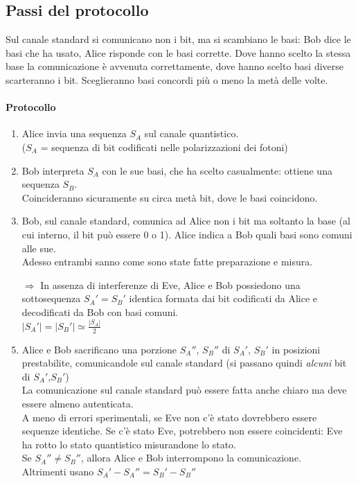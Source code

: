 \documentclass[10pt]{book}
\begin{document}
\subsection{Passi del protocollo}
Sul canale standard si comunicano non i bit, ma si scambiano le basi: Bob dice le basi che ha usato, Alice risponde con le basi corrette. Dove hanno scelto la stessa base la comunicazione è avvenuta correttamente, dove hanno scelto basi diverse scarteranno i bit. Sceglieranno basi concordi più o meno la metà delle volte.
\paragraph{Protocollo} \begin{enumerate}
	\item Alice invia una sequenza $S_A$ sul canale quantistico.\\($S_A$ = sequenza di bit codificati nelle polarizzazioni dei fotoni)
	\item Bob interpreta $S_A$ con le sue basi, che ha scelto casualmente: ottiene una sequenza $S_B$.\\
	Coincideranno sicuramente su circa metà bit, dove le basi coincidono.
	\item Bob, sul canale standard, comunica ad Alice non i bit ma soltanto la base (al cui interno, il bit può essere 0 o 1). Alice indica a Bob quali basi sono comuni alle sue.\\
	Adesso entrambi sanno come sono state fatte preparazione e misura.
	\item[$\Rightarrow$] In assenza di interferenze di Eve, Alice e Bob possiedono una sottosequenza $S_A' = S_B'$ identica formata dai bit codificati da Alice e decodificati da Bob con basi comuni.\\
	$|S_A'|=|S_B'| \simeq \frac{|S_A|}{2}$
	\item Alice e Bob sacrificano una porzione $S_A''$, $S_B''$ di $S_A'$, $S_B'$ in posizioni prestabilite, comunicandole sul canale standard (si passano quindi \textit{alcuni} bit di $S_A'$,$S_B'$)\\
	La comunicazione sul canale standard può essere fatta anche chiaro ma deve essere almeno autenticata.\\
	A meno di errori sperimentali, se Eve non c'è stato dovrebbero essere sequenze identiche. Se c'è stato Eve, potrebbero non essere coincidenti: Eve ha rotto lo stato quantistico misurandone lo stato.\\
	Se $S_A''\neq S_B''$, allora Alice e Bob interrompono la comunicazione.\\
	Altrimenti usano $S_A' - S_A'' = S_B' - S_B''$
\end{enumerate}
\end{document}
